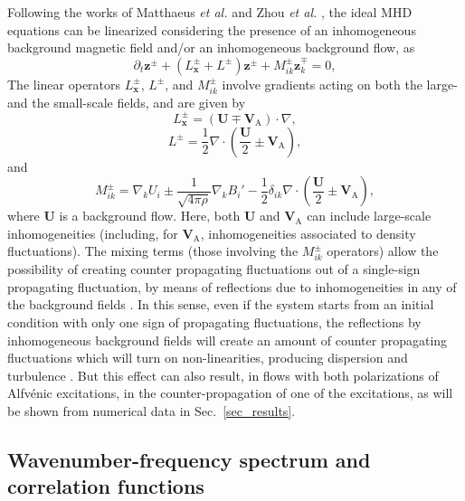 \documentclass[aip,pop,reprint,amsmath,amssymb,floatfix]{revtex4-1}
\renewcommand{\vec}[1]{\mathbf{#1}}
\begin{document}
Following the works of Matthaeus {\it et al.}
\cite{matthaeus1994transport} and Zhou {\it et al.}
\cite{zhou1990remarks}, the ideal MHD equations can be linearized
considering the presence of an inhomogeneous background magnetic field
and/or an inhomogeneous background flow, as
\begin{equation}\label{eq:MHD_zpzm}
  \partial_t \vec{z}^\pm
  + \left( L^\pm_\vec{x} + L^\pm \right) \vec{z}^\pm
  + M^\pm_{ik} \vec{z}^\mp_k
  = 0,
\end{equation}
The linear operators $L^\pm_\vec{x}$, $L^\pm$, and $M^\pm_{ik}$
involve gradients acting on both the large- and the small-scale
fields, and are given by
\begin{equation}\label{eq:MHD_Lx}
  L^\pm_\vec{x} = \left( \vec{U} \mp \vec{V}_\textrm{A} \right) \cdot \nabla ,
\end{equation}
\begin{equation}\label{eq:MHD_L}
  L^\pm = \frac{1}{2} \nabla \cdot \left( \frac{\vec{U}}{2} \pm \vec{V}_\textrm{A} 
  \right) ,
\end{equation}
and
\begin{equation}\label{eq:MHD_Mik}
  M^\pm_{ik} = \nabla_k U_i \pm \frac{1}{\sqrt{4\pi\rho}} \nabla_k B_i'
  - \frac{1}{2} \delta_{ik} \nabla\cdot \left( \frac{\vec{U}}{2} \pm
  \vec{V}_\textrm{A} \right) ,
\end{equation}
where $\vec{U}$ is a background flow. Here, both $\vec{U}$ and
$\vec{V}_\textrm{A}$ can include large-scale inhomogeneities
(including, for $\vec{V}_\textrm{A}$, inhomogeneities associated to
density fluctuations). The mixing terms (those involving the
$M_{ik}^\pm$ operators) allow the possibility of creating counter
propagating fluctuations out of a single-sign propagating fluctuation,
by means of reflections due to inhomogeneities in any of the
background fields \cite{velli_1993_propagation}. In this sense, even
if the system starts from an initial condition with only one sign of
propagating fluctuations, the reflections by inhomogeneous background
fields will create an amount of counter propagating fluctuations which
will turn on non-linearities, producing dispersion and turbulence
\cite{matthaeus_1999_coronal, dmitruk_2001_coronal}. But this effect
can also result, in flows with both polarizations of Alfv\'enic
excitations, in the counter-propagation of one of the excitations, as
will be shown from numerical data in Sec.~\ref{sec_results}.

\subsection{Wavenumber-frequency spectrum and correlation functions}\label{sec_Wfspectrum_and_Gamma}
\end{document}

